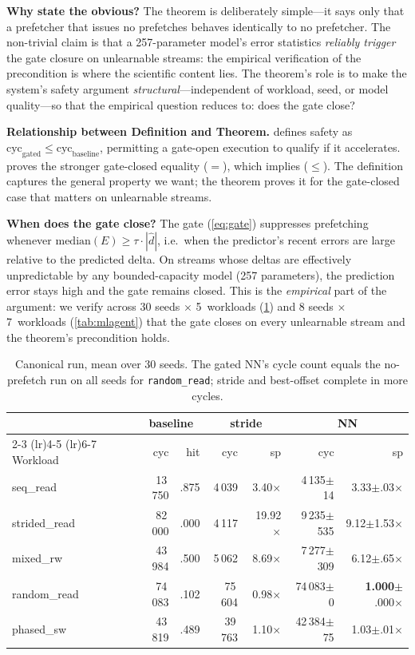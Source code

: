\documentclass[conference]{IEEEtran}
\begin{document}
\smallskip
\noindent\textbf{Why state the obvious?}
The theorem is deliberately simple---it says only that a prefetcher that issues no
prefetches behaves identically to no prefetcher. The non-trivial claim is that a
257-parameter model's error statistics \emph{reliably trigger} the gate closure on
unlearnable streams: the empirical verification of the precondition is where the
scientific content lies. The theorem's role is to make the system's safety argument
\emph{structural}---independent of workload, seed, or model quality---so that the
empirical question reduces to: does the gate close?

\smallskip
\noindent\textbf{Relationship between Definition and Theorem.}
 defines safety as $\text{cyc}_{\text{gated}} \leq \text{cyc}_{\text{baseline}}$,
permitting a gate-open execution to qualify if it accelerates. 
proves the stronger gate-closed equality ($=$), which implies ($\leq$). The
definition captures the general property we want; the theorem proves it for the
gate-closed case that matters on unlearnable streams.

\smallskip
\noindent\textbf{When does the gate close?}
The gate (\cref{eq:gate}) suppresses prefetching whenever
$\text{median}(E) \geq \tau \cdot |\hat{d}|$, i.e.\ when the predictor's recent
errors are large relative to the predicted delta. On streams whose deltas are
effectively unpredictable by any bounded-capacity model (257 parameters), the
prediction error stays high and the gate remains closed. This is the
\emph{empirical} part of the argument: we verify across 30 seeds $\times$
5~workloads (\cref{tab:canonical}) and 8 seeds $\times$ 7~workloads
(\cref{tab:mlagent}) that the gate closes on every unlearnable stream and the
theorem's precondition holds.

\begin{table}[t]
\centering
\caption{Canonical run, mean over 30 seeds. The gated NN's cycle count equals the
no-prefetch run on all seeds for \texttt{random\_read}; stride and best-offset
complete in more cycles.}
\label{tab:canonical}
\begin{tabular}{@{}l rr rr rr@{}}
\toprule
& \multicolumn{2}{c}{baseline} & \multicolumn{2}{c}{stride} & \multicolumn{2}{c}{NN} \\
\cmidrule(lr){2-3} \cmidrule(lr){4-5} \cmidrule(lr){6-7}
Workload & cyc & hit & cyc & sp & cyc & sp \\
\midrule
seq\_read     & 13\,750 & .875 & 4\,039 & 3.40$\times$ & 4\,135$\pm$14 & 3.33$\pm$.03$\times$ \\
strided\_read & 82\,000 & .000 & 4\,117 & 19.92$\times$ & 9\,235$\pm$535 & 9.12$\pm$1.53$\times$ \\
mixed\_rw     & 43\,984 & .500 & 5\,062 & 8.69$\times$ & 7\,277$\pm$309 & 6.12$\pm$.65$\times$ \\
random\_read  & 74\,083 & .102 & 75\,604 & 0.98$\times$ & 74\,083$\pm$0 & \textbf{1.000}$\pm$.000$\times$ \\
phased\_sw    & 43\,819 & .489 & 39\,763 & 1.10$\times$ & 42\,384$\pm$75 & 1.03$\pm$.01$\times$ \\
\bottomrule
\end{tabular}
\end{table}
\end{document}
